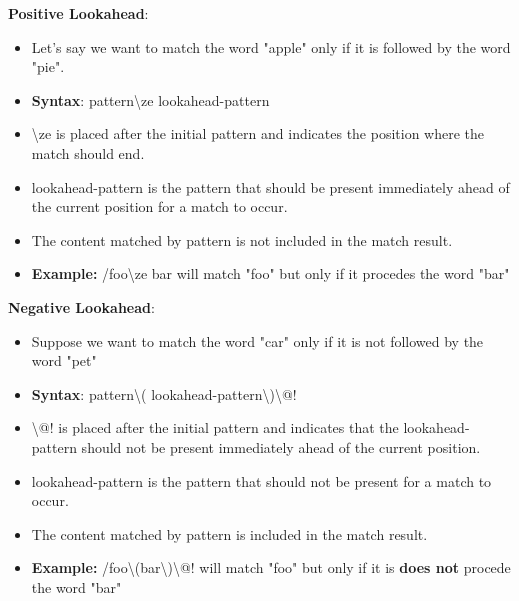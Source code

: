 \documentclass{report}
\begin{document}
    \bigbreak \noindent 
    \textbf{Positive Lookahead}:
    \begin{itemize}
        \item Let's say we want to match the word "apple" only if it is followed by the word "pie".
        \item \textbf{Syntax}: pattern\textbackslash ze lookahead-pattern
        \item \textbackslash ze is placed after the initial pattern and indicates the position where the match should end.
        \item lookahead-pattern is the pattern that should be present immediately ahead of the current position for a match to occur.
        \item The content matched by pattern is not included in the match result.
        \item \textbf{Example:} /foo\textbackslash ze bar will match "foo" but only if it procedes the word "bar"
    \end{itemize}

    \bigbreak \noindent 
    \textbf{Negative Lookahead}:
    \begin{itemize}
        \item Suppose we want to match the word "car" only if it is not followed by the word "pet"
        \item \textbf{Syntax}: pattern\textbackslash( lookahead-pattern\textbackslash)\textbackslash @!
        \item \textbackslash @! is placed after the initial pattern and indicates that the lookahead-pattern should not be present immediately ahead of the current position.
        \item lookahead-pattern is the pattern that should not be present for a match to occur.
        \item The content matched by pattern is included in the match result.
        \item \textbf{Example:} /foo\textbackslash(bar\textbackslash)\textbackslash @! will match "foo" but only if it is \textbf{does not} procede the word "bar"
    \end{itemize}
\end{document}
